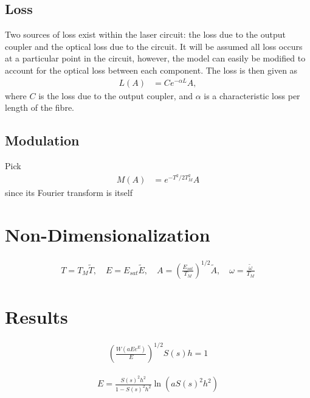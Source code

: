 \documentclass[12pt]{article}
\newcommand{\Es}{E_{sat}}
\begin{document}
\subsection{Loss}
Two sources of loss exist within the laser circuit: the loss due to the output coupler and the optical loss due to the circuit. It will be assumed all loss occurs at a particular point in the circuit, however, the model can easily be modified to account for the optical loss between each component. The loss is then given as
\begin{align*}
L(A) &= C e^{- \alpha L}A,
\end{align*}
where $C$ is the loss due to the output coupler, and $\alpha$ is a characteristic loss per length of the fibre.

\subsection{Modulation}
Pick
\begin{align*}
M(A) &= e^{-T^2 / 2 T_M^2} A
\end{align*}
since its Fourier transform is itself

\section{Non-Dimensionalization}

\begin{align*}
T = T_M \widetilde{T}, \quad E = \Es \widetilde{E}, \quad A = \left( \frac{\Es}{T_M} \right)^{1/2} \widetilde{A}, \quad \omega = \frac{\widetilde{\omega}}{T_M}
\end{align*}




\section{Results}

\begin{align*}
\left( \frac{W(a E e^E)}{E} \right)^{1/2} S(s) h = 1
\end{align*}

\begin{align*}
E = \frac{S(s)^2 h^2}{1 - S(s)^2 h^2} \ln \left( a S(s)^2 h^2 \right)
\end{align*}


\begin{figure}[htbp]
\centering
{}
\caption{}
\label{fig:}
\end{figure}
\end{document}
